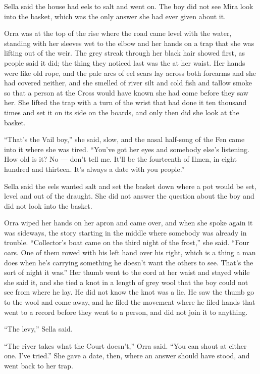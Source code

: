 Sella said the house had eels to salt and went on. The boy did not see Mira look into the basket, which was the only answer she had ever given about it.

Orra was at the top of the rise where the road came level with the water, standing with her sleeves wet to the elbow and her hands on a trap that she was lifting out of the weir. The grey streak through her black hair showed first, as people said it did; the thing they noticed last was the  at her waist. Her hands were like old rope, and the pale arcs of eel scars lay across both forearms and she had covered neither, and she smelled of river silt and cold fish and tallow smoke so that a person at the Cross would have known she had come before they saw her. She lifted the trap with a turn of the wrist that had done it ten thousand times and set it on its side on the boards, and only then did she look at the basket.

“That's the Vail boy,” she said, slow, and the nasal half-song of the Fen came into it where she was tired. “You've got her eyes and somebody else's listening. How old is it? No --- don't tell me. It'll be the fourteenth of Ilmen, in eight hundred and thirteen. It's always a date with you people.”

Sella said the eels wanted salt and set the basket down where a pot would be set, level and out of the draught. She did not answer the question about the boy and did not look into the basket.

Orra wiped her hands on her apron and came over, and when she spoke again it was sideways, the story starting in the middle where somebody was already in trouble. “Collector's boat came on the third night of the frost,” she said. “Four oars. One of them rowed with his left hand over his right, which is a thing a man does when he's carrying something he doesn't want the others to see. That's the sort of night it was.” Her thumb went to the cord at her waist and stayed while she said it, and she tied a knot in a length of grey wool that the boy could not see from where he lay. He did not know the knot was a lie. He saw the thumb go to the wool and come away, and he filed the movement where he filed hands that went to a record before they went to a person, and did not join it to anything.

“The levy,” Sella said.

“The river takes what the Court doesn't,” Orra said. “You can shout at either one. I've tried.” She gave a date, then, where an answer should have stood, and went back to her trap.

